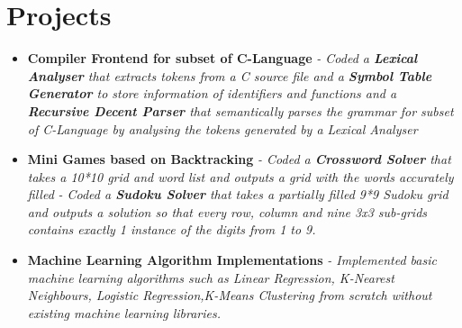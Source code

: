 \documentclass{article}
\begin{document}
\section*{Projects}
\begin{itemize}
    \item{\textbf{\large{Compiler Frontend for subset of C-Language}}}
          \newline
          \textit{- Coded a \textbf{Lexical Analyser} that extracts tokens from a C source file and a \textbf{Symbol Table Generator} to store information of identifiers and functions and a \textbf{Recursive Decent Parser} that semantically parses the grammar for subset of C-Language by analysing the tokens generated by a Lexical Analyser}
    \item{\textbf{\large{Mini Games based on Backtracking}}}
          \newline
          \textit{- Coded a \textbf{Crossword Solver} that takes a 10*10 grid and word list and outputs a grid with the words accurately filled}
          \newline
          \textit{- Coded a \textbf{Sudoku Solver} that takes a partially filled 9*9 Sudoku grid and outputs a solution so that every row, column and nine 3x3 sub-grids contains exactly 1 instance of the digits from 1 to 9.}
    \item{\textbf{\large{Machine Learning Algorithm Implementations}}}
          \newline
          \textit{- Implemented basic machine learning algorithms such as Linear Regression, K-Nearest Neighbours, Logistic Regression,K-Means Clustering from scratch without existing machine learning libraries. %
}
\end{itemize}
\end{document}
